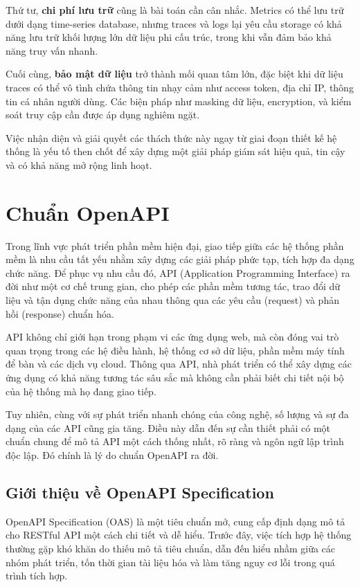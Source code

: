 \documentclass{uetgraduation}
\begin{document}
Thứ tư, \textbf{chi phí lưu trữ} cũng là bài toán cần cân nhắc. Metrics có thể lưu trữ dưới dạng time-series database, nhưng traces và logs lại yêu cầu storage có khả năng lưu trữ khối lượng lớn dữ liệu phi cấu trúc, trong khi vẫn đảm bảo khả năng truy vấn nhanh.

Cuối cùng, \textbf{bảo mật dữ liệu} trở thành mối quan tâm lớn, đặc biệt khi dữ liệu traces có thể vô tình chứa thông tin nhạy cảm như access token, địa chỉ IP, thông tin cá nhân người dùng. Các biện pháp như masking dữ liệu, encryption, và kiểm soát truy cập cần được áp dụng nghiêm ngặt.

Việc nhận diện và giải quyết các thách thức này ngay từ giai đoạn thiết kế hệ thống là yếu tố then chốt để xây dựng một giải pháp giám sát hiệu quả, tin cậy và có khả năng mở rộng linh hoạt.


 \section{Chuẩn OpenAPI}

Trong lĩnh vực phát triển phần mềm hiện đại, giao tiếp giữa các hệ thống phần mềm là nhu cầu tất yếu nhằm xây dựng các giải pháp phức tạp, tích hợp đa dạng chức năng. Để phục vụ nhu cầu đó, API (Application Programming Interface) ra đời như một cơ chế trung gian, cho phép các phần mềm tương tác, trao đổi dữ liệu và tận dụng chức năng của nhau thông qua các yêu cầu (request) và phản hồi (response) chuẩn hóa.

API không chỉ giới hạn trong phạm vi các ứng dụng web, mà còn đóng vai trò quan trọng trong các hệ điều hành, hệ thống cơ sở dữ liệu, phần mềm máy tính để bàn và các dịch vụ cloud. Thông qua API, nhà phát triển có thể xây dựng các ứng dụng có khả năng tương tác sâu sắc mà không cần phải biết chi tiết nội bộ của hệ thống mà họ đang giao tiếp.

Tuy nhiên, cùng với sự phát triển nhanh chóng của công nghệ, số lượng và sự đa dạng của các API cũng gia tăng. Điều này dẫn đến sự cần thiết phải có một chuẩn chung để mô tả API một cách thống nhất, rõ ràng và ngôn ngữ lập trình độc lập. Đó chính là lý do chuẩn OpenAPI ra đời.

\subsection{Giới thiệu về OpenAPI Specification}

OpenAPI Specification (OAS) \cite{openapi} là một tiêu chuẩn mở, cung cấp định dạng mô tả cho RESTful API một cách chi tiết và dễ hiểu. Trước đây, việc tích hợp hệ thống thường gặp khó khăn do thiếu mô tả tiêu chuẩn, dẫn đến hiểu nhầm giữa các nhóm phát triển, tốn thời gian tài liệu hóa và làm tăng nguy cơ lỗi trong quá trình tích hợp.
\end{document}
